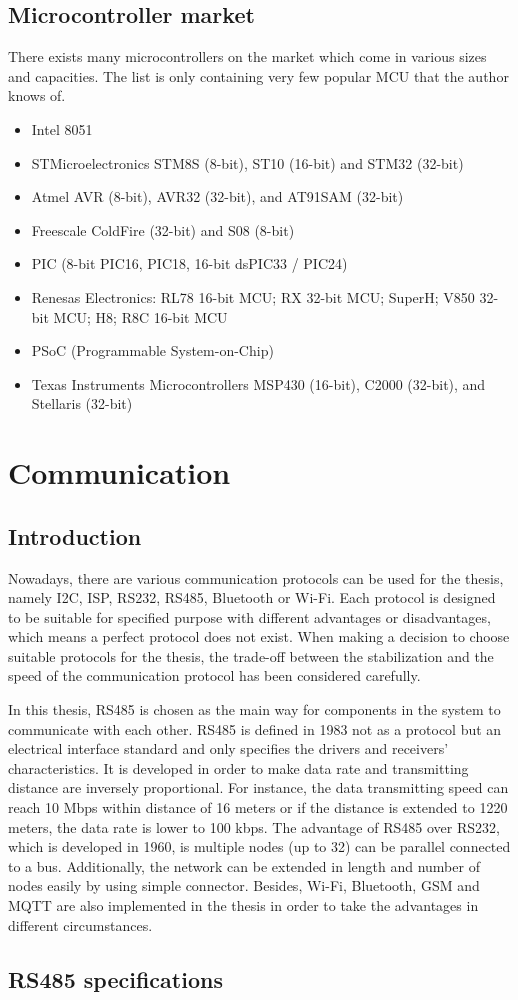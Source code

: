   \subsection{Microcontroller market}
  There exists many microcontrollers on the market which come in various sizes and capacities. The list is only containing very few popular MCU that the author knows of.
  \begin{itemize}
    \item Intel 8051
    \item STMicroelectronics STM8S (8-bit), ST10 (16-bit) and STM32 (32-bit)
    \item Atmel AVR (8-bit), AVR32 (32-bit), and AT91SAM (32-bit)
    \item Freescale ColdFire (32-bit) and S08 (8-bit)
    \item PIC (8-bit PIC16, PIC18, 16-bit dsPIC33 / PIC24)
    \item Renesas Electronics: RL78 16-bit MCU; RX 32-bit MCU; SuperH; V850 32-
    bit MCU; H8; R8C 16-bit MCU
    \item PSoC (Programmable System-on-Chip)
    \item Texas Instruments Microcontrollers MSP430 (16-bit), C2000 (32-bit), and
    Stellaris (32-bit)
  \end{itemize}

\section{Communication}
  \subsection{Introduction}
  Nowadays, there are various communication protocols can be used for the thesis, namely I2C, ISP, RS232, RS485, Bluetooth or Wi-Fi. Each protocol is designed to be suitable for specified purpose with different advantages or disadvantages, which means a perfect protocol does not exist. When making a decision to choose suitable protocols for the thesis, the trade-off between the stabilization and the speed of the communication protocol has been considered carefully.

  In this thesis, RS485 is chosen as the main way for components in the system to communicate with each other. RS485 is defined in 1983 not as a protocol but an electrical interface standard and only specifies the drivers and receivers’ characteristics. It is developed in order to make data rate and transmitting distance are inversely proportional. For instance, the data transmitting speed can reach 10 Mbps within distance of 16 meters or if the distance is extended to 1220 meters, the data rate is lower to 100 kbps. The advantage of RS485 over RS232, which is developed in 1960, is multiple nodes (up to 32) can be parallel connected to a bus. Additionally, the network can be extended in length and number of nodes easily by using simple connector. Besides, Wi-Fi, Bluetooth, GSM and MQTT are also implemented in the thesis in order to take the advantages in different circumstances.
  
  \subsection{RS485 specifications}

  


